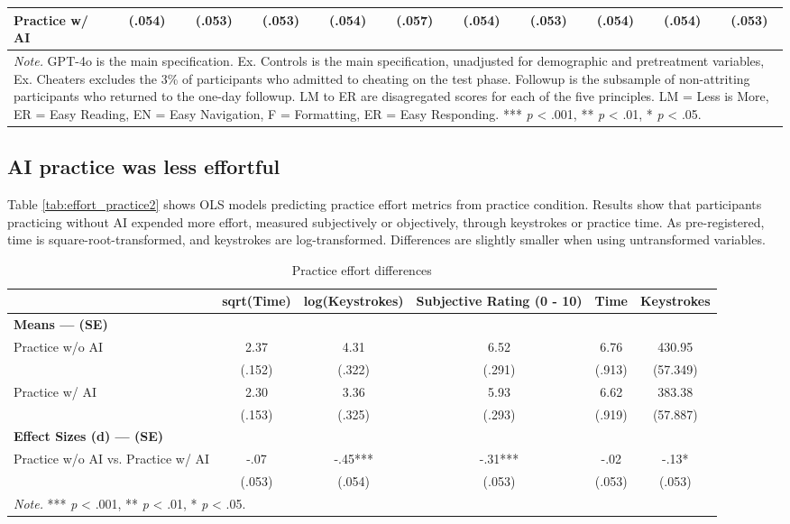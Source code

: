 \documentclass[11pt]{report}
\begin{document}
\begin{append}
\begin{table}[h]
\begin{tabular}{lcccccccccc}
 Practice w/ AI& (.054) & (.053) & (.053) & (.054) & (.057) & (.054) & (.053) & (.054) & (.054) & (.053) \\ 
\midrule
\multicolumn{11}{p{16.5cm}}{\textit{Note.} GPT-4o is the main specification. Ex. Controls is the main specification, unadjusted for demographic and pretreatment variables, Ex. Cheaters excludes the 3\% of participants who admitted to cheating on the test phase. Followup is the subsample of non-attriting participants who returned to the one-day followup. LM to ER are disagregated scores for each of the five principles. LM = Less is More, ER = Easy Reading, EN = Easy Navigation, F = Formatting, ER = Easy Responding.  *** \textit{p} < .001, ** \textit{p} < .01, * \textit{p} < .05.}
\vspace{5pt}
\end{tabular}
    \label{tab:s2_test}
\end{table}

\FloatBarrier
\subsection{AI practice was less effortful}

Table \ref{tab:effort_practice2} shows OLS models predicting practice effort metrics from practice condition. Results show that participants practicing without AI expended more effort, measured subjectively or objectively, through keystrokes or practice time. As pre-registered, time is square-root-transformed, and keystrokes are log-transformed. Differences are slightly smaller when using untransformed variables.

\begin{table}[H]
    \centering
    \footnotesize
    \caption{Practice effort differences}
\begin{tabular}{lccccc}
\toprule
  & sqrt(Time) & log(Keystrokes) & Subjective Rating (0 - 10) & Time & Keystrokes \\ 
\midrule
\multicolumn{6}{l}{\textbf{Means --- (SE)}} \\ 
\midrule
Practice w/o AI & 2.37 & 4.31 & 6.52 & 6.76 & 430.95 \\ 
 & (.152) & (.322) & (.291) & (.913) & (57.349) \\ 
Practice w/ AI & 2.30 & 3.36 & 5.93 & 6.62 & 383.38 \\ 
 & (.153) & (.325) & (.293) & (.919) & (57.887) \\ 
\midrule
\multicolumn{6}{l}{\textbf{Effect Sizes (d) --- (SE)}} \\ 
\midrule
Practice w/o AI vs. Practice w/ AI & -.07 & -.45*** & -.31*** & -.02 & -.13* \\ 
 & (.053) & (.054) & (.053) & (.053) & (.053) \\ 
\midrule
\multicolumn{6}{l}{\textit{Note.} *** \textit{p} < .001, ** \textit{p} < .01, * \textit{p} < .05.}
\vspace{5pt}


\end{tabular}
\end{table}
\end{append}
\end{document}
